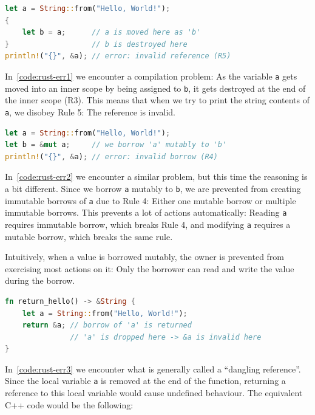 \documentclass[11pt,
               a4paper,
               bibtotoc,
               idxtotoc,
               headsepline,
               footsepline,
               footexclude,
               BCOR12mm,
               DIV13,
               openany,   %
               ]
               {scrbook}
\begin{document}
\vspace{0.5em}
\begin{lstlisting}[style=eclipse-rust, language=Rust, basicstyle=\ttfamily\small, caption=Code breaks Rule 5, label=code:rust-err1]
let a = String::from("Hello, World!");
{
    let b = a;      // a is moved here as 'b'
}                   // b is destroyed here
println!("{}", &a); // error: invalid reference (R5)
\end{lstlisting}

In~\autoref{code:rust-err1} we encounter a compilation problem: As the variable \texttt{a} gets moved into an inner scope by being assigned to \texttt{b}, it gets destroyed at the end of the inner scope (R3). This means that when we try to print the string contents of \texttt{a}, we disobey Rule 5: The reference is invalid.

\vspace{0.5em}
\begin{lstlisting}[style=eclipse-rust, language=Rust, basicstyle=\ttfamily\small, caption=Code breaks Rule 4, label=code:rust-err2]
let a = String::from("Hello, World!");
let b = &mut a;     // we borrow 'a' mutably to 'b'
println!("{}", &a); // error: invalid borrow (R4)
\end{lstlisting}

In~\autoref{code:rust-err2} we encounter a similar problem, but this time the reasoning is a bit different. Since we borrow \texttt{a} mutably to \texttt{b}, we are prevented from creating immutable borrows of \texttt{a} due to Rule 4: Either one mutable borrow or multiple immutable borrows. This prevents a lot of actions automatically: Reading \texttt{a} requires immutable borrow, which breaks Rule 4, and modifying \texttt{a} requires a mutable borrow, which breaks the same rule.

Intuitively, when a value is borrowed mutably, the owner is prevented from exercising most actions on it: Only the borrower can read and write the value during the borrow.

\vspace{0.5em}
\begin{lstlisting}[style=eclipse-rust, language=Rust, basicstyle=\ttfamily\small, caption=Code breaks Rule 1 and 5, label=code:rust-err3]
fn return_hello() -> &String {
    let a = String::from("Hello, World!");
    return &a; // borrow of 'a' is returned
               // 'a' is dropped here -> &a is invalid here
}
\end{lstlisting}

In~\autoref{code:rust-err3} we encounter what is generally called a ``dangling reference''. Since the local variable \texttt{a} is removed at the end of the function, returning a reference to this local variable would cause undefined behaviour. The equivalent C++ code would be the following:
\end{document}
